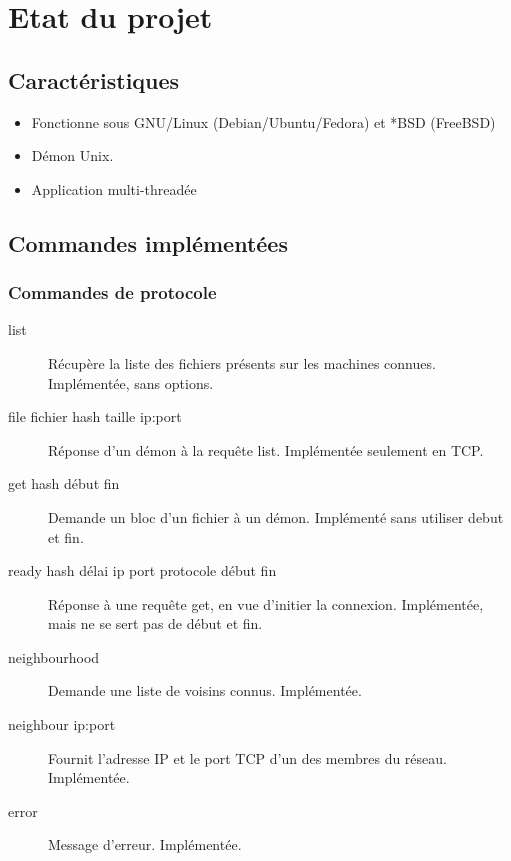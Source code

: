 \chapter{Etat du projet}

\section{Caractéristiques}
\begin{itemize}
    \item Fonctionne sous GNU/Linux (Debian/Ubuntu/Fedora) et *BSD (FreeBSD)
    \item Démon Unix.
    \item Application multi-threadée
\end{itemize}
\section{Commandes implémentées}

\subsection{Commandes de protocole}
\begin{description}

    \item[list] Récupère la liste des fichiers présents sur les machines
    connues. Implémentée, sans options.

    \item[file fichier hash taille ip:port] Réponse d'un démon à la requête
    list. Implémentée seulement en TCP.

    \item[get hash début fin] Demande un bloc d'un fichier à un démon.
    Implémenté sans utiliser debut et fin.

    \item[ready hash délai ip port protocole début fin] Réponse à une requête
    get, en vue d'initier la connexion. Implémentée, mais ne se sert pas de
    début et fin.

    \item[neighbourhood] Demande une liste de voisins connus. Implémentée.

    \item[neighbour ip:port] Fournit l'adresse IP et le port TCP d'un des
    membres du réseau. Implémentée.

    \item[error] Message d'erreur. Implémentée.

\end{description}

